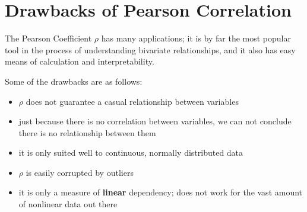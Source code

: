 \documentclass[11pt]{article}
\begin{document}
\section{Drawbacks of Pearson Correlation}
The Pearson Coefficient $\rho$ has many applications; it is by far the most popular tool in the process of understanding bivariate relationships, and it also has easy means of calculation and interpretability.

Some of the drawbacks are as follows:

\begin{itemize}
\item $\rho$ does not guarantee a casual relationship between variables
\item just because there is no correlation between variables, we can not conclude there is no relationship between them
\item it is only suited well to continuous, normally distributed data
\item $\rho$ is easily corrupted by outliers
\item it is only a measure of \textbf{linear} dependency; does not work for the vast amount of nonlinear data out there

\end{itemize}
\end{document}
